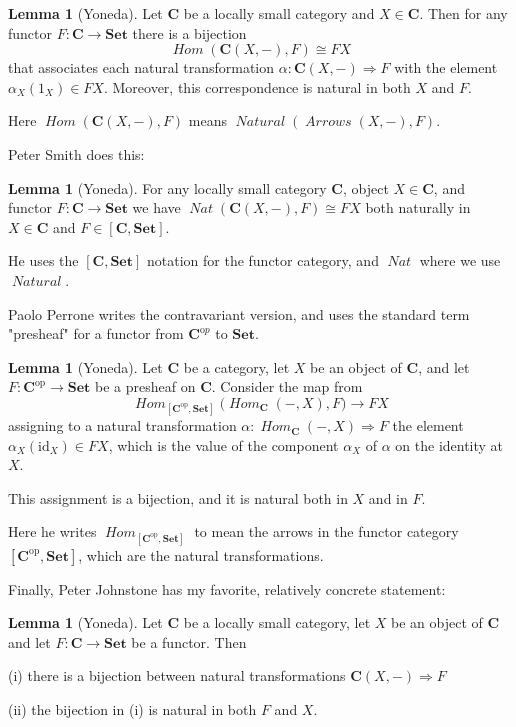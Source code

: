 \documentclass[12pt]{article}
\theoremstyle{definition}
\newtheorem{lemma}[thm]{Lemma}
\theoremstyle{definition}
\theoremstyle{definition}
\numberwithin{equation}{section}
\newcommand{\op}{\mathrm{op}}           %
\newcommand{\cat}[1]{\mathbf{#1}}      %
\newcommand{\fcat}[1]{{\mathbf {#1}}}    %
\newcommand{\id}{\mathrm{id}} %
\newcommand{\CC}{\cat{C}}
\newcommand{\CCop}{\cat{C}^{\mathrm op}}
\DeclareMathOperator{\Arrows}{\mathit{Arrows}}
\DeclareMathOperator{\Hom}{\mathit{Hom}}
\DeclareMathOperator{\Nat}{\mathit{Natural}}
\newcommand{\Set}{\fcat{Set}}           %
\newcommand{\iso}{\cong}                %
\newcommand{\fto}{\Rightarrow}
\def\pg{\bigskip\goodbreak
\ni}
\def\ni{\goodbreak\noindent}
\begin{document}
\begin{lemma}[Yoneda]\label{yoneda-rhiel} Let $\CC$ be a locally small category and $X \in
\CC$. Then for any functor $F : \CC \to \Set$ there is a bijection
$$
\Hom(\CC(X,-), F) \iso FX
$$
that associates each natural transformation $\alpha:\CC(X,-) \fto F$ with the element
$\alpha_X(1_X) \in FX$. Moreover, this correspondence is natural in both $X$ and $F$.
\end{lemma}
\ni
Here $\Hom(\CC(X,-), F)$ means $\Nat(\Arrows(X,-), F)$.

\pg
Peter Smith \cite{Smith} does this:

\begin{lemma}[Yoneda]\label{yoneda-smith} For any locally small category $\CC$, object $X \in
\CC$, and functor $F:\CC \to \Set$ we have  $\mathop{\mathit{Nat}}(\CC(X,-),F) \iso FX$ both naturally in
$X \in \CC$ and $F \in [\CC, \Set]$.
\end{lemma}
\ni
He uses the $[\CC, \Set]$ notation for the functor category, and $\mathop{\mathit{Nat}}$ where we use $\Nat$.

\pg
Paolo Perrone \cite{Perrone} writes the contravariant version, and uses the standard term "presheaf" 
for a functor from $\CCop$ to $\Set$.

\begin{lemma}[Yoneda]\label{yoneda-perrone} Let $\cat{C}$ be a category, let $X$ be an object of
 $\cat{C}$, and let $F:\cat{C}^\op\to\Set$ be a presheaf on $\cat{C}$. Consider the map
 from
 $$
 \Hom_{[\cat{C}^\op,\Set]} \bigl(\Hom_\cat{C} (-,X) , F \bigr) \to FX
 $$
 assigning to a natural transformation $\alpha:\Hom_\cat{C} (-,X)\fto F$ the element
 $\alpha_X(\id_X)\in FX$, which is the value of the component $\alpha_X$ of $\alpha$ on
 the identity at $X$. 

This assignment is a bijection, and it is natural both in $X$ and in $F$.
\end{lemma}
\ni
Here he writes $\Hom_{[\cat{C}^\op,\Set]}$ to mean the arrows in the functor category $[\cat{C}^\op,\Set]$,
which are the natural transformations.

\bigskip
\noindent
Finally, Peter Johnstone \cite{Johnstone} has my favorite, relatively concrete statement:

\begin{lemma}[Yoneda]\label{yoneda-johnstone} Let $\CC$ be a locally small category, let $X$ be an object of $\CC$
and let $F:\CC \to \Set$ be a functor. Then

(i)  there is a bijection between natural transformations $\CC(X, -) \fto F$

(ii) the bijection in (i) is natural in both $F$ and $X$.
\end{lemma}
\end{document}
